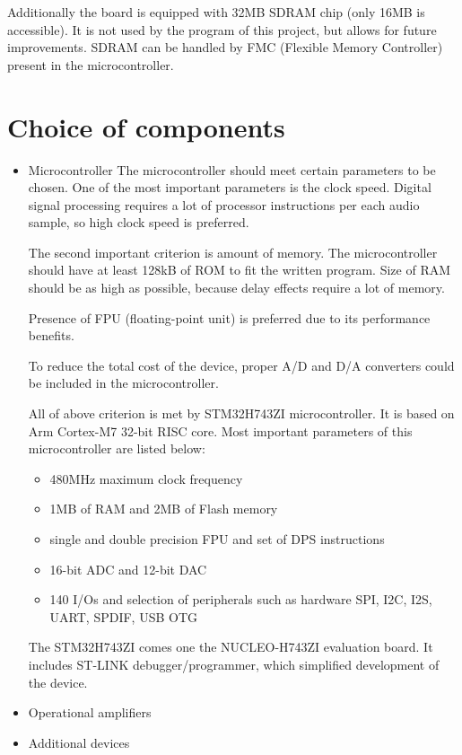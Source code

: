 \documentclass[a4paper,twoside,12pt]{book}
\begin{document}
Additionally  the board is equipped with 32MB SDRAM chip (only 16MB is accessible).
It is not used by the program of this project, but allows for future improvements.
SDRAM can be handled by FMC (Flexible Memory Controller) present in the microcontroller.
\newpage

\section{Choice of components}

\begin{itemize}
    \item Microcontroller
    The microcontroller should meet certain parameters to be chosen.
    One of the most important parameters is the clock speed.
    Digital signal processing requires a lot of processor instructions per each audio sample,
    so high clock speed is preferred.

    The second important criterion is amount of memory.
    The microcontroller should have at least 128kB of ROM to fit the written program.
    Size of RAM should be as high as possible, because delay effects require a lot of memory.

    Presence of FPU (floating-point unit) is preferred due to its performance benefits.

    To reduce the total cost of the device, proper A/D and D/A converters could be included in the microcontroller.

    All of above criterion is met by STM32H743ZI microcontroller.
    It is based on Arm Cortex-M7 32-bit RISC core.
    Most important parameters of this microcontroller are listed below:
    \begin{itemize}
        \item 480MHz maximum clock frequency
        \item 1MB of RAM and 2MB of Flash memory
        \item single and double precision FPU and set of DPS instructions
        \item 16-bit ADC and 12-bit DAC
        \item 140 I/Os and selection of peripherals such as hardware SPI, I2C, I2S, UART, SPDIF, USB OTG
    \end{itemize}

    The STM32H743ZI comes one the NUCLEO-H743ZI evaluation board.
    It includes ST-LINK debugger/programmer, which simplified development of the device. 
    \item Operational amplifiers
    \item Additional devices
\end{itemize}
\end{document}
